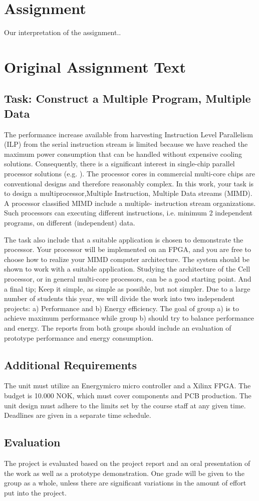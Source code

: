 \section{Assignment}

Our interpretation of the assignment..

\section{Original Assignment Text}

\subsection{Task: Construct a Multiple Program, Multiple Data}
The performance increase available from harvesting Instruction Level Parallelism
(ILP) from the serial instruction stream is limited because we have reached the
maximum power consumption that can be handled without expensive cooling
solutions\cite{olukotun}. Consequently, there is a significant interest in single-chip
parallel processor solutions (e.g. \cite{bell,kongetira}). The processor cores in commercial
multi-core chips are conventional designs and therefore reasonably complex. In
this work, your task is to design a multiprocessor,Multiple Instruction,
Multiple Data streams (MIMD). A processor classified MIMD include a multiple-
instruction stream organizations\cite{flynn}. Such processors can executing different
instructions, i.e. minimum 2 independent programs, on different (independent)
data.

The task also include that a suitable application is chosen to demonstrate the
processor. Your processor will be implemented on an FPGA, and you are free to
choose how to realize your MIMD computer architecture. The system should be
shown to work with a suitable application. Studying the architecture of the
Cell processor\cite{wiki_cell_mpu}, or in general multi-core processors\cite{wiki_multicore}, can be a good
starting point. And a final tip; Keep it simple, as simple as possible, but not
simpler. Due to a large number of students this year, we will divide the work
into two independent projects: a) Performance and b) Energy efficiency. The goal
of group a) is to achieve maximum performance while group b) should try to
balance performance and energy. The reports from both groups should include an
evaluation of prototype performance and energy consumption.

\subsection{Additional Requirements}
The unit must utilize an Energymicro micro controller and a Xilinx FPGA. The
budget is 10.000 NOK, which must cover components and PCB production. The unit
design must adhere to the limits set by the course staff at any given time.
Deadlines are given in a separate time schedule.

\subsection{Evaluation}
The project is evaluated based on the project report and an oral presentation of
the work as well as a prototype demonstration. One grade will be given to the
group as a whole, unless there are significant variations in the amount of
effort put into the project.

